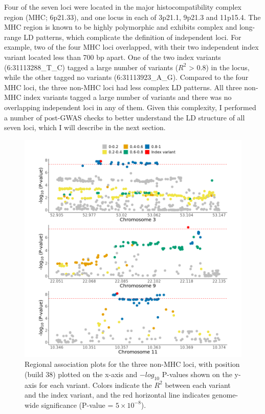     Four of the seven loci were located in the major histocompatibility complex region (MHC; 6p21.33), and one locus in each of 3p21.1, 9p21.3 and 11p15.4. The MHC region is known to be highly polymorphic and exhibits complex and long-range LD patterns, which complicate the definition of independent loci. 
    For example, two of the four MHC loci overlapped, with their two independent index variant located less than 700 bp apart. One of the two index variants (6:31113288\_T\_C) tagged a large number of variants ($R^{2}$ > 0.8) in the locus, while the other tagged no variants (6:31113923\_A\_G). Compared to the four MHC loci, the three non-MHC loci had less complex LD patterns. All three non-MHC index variants tagged a large number of variants and there was no overlapping independent loci in any of them. Given this complexity, I performed a number of post-GWAS checks to better understand the LD structure of all seven loci, which I will describe in the next section.


    \begin{figure}[H] 
      \centering    
      \includegraphics[width=1.0\textwidth]{Vector/ukbb_nonmhc_regional_assoc_plots.png}
      \caption[Figure]{Regional association plots for the three non-MHC loci, with position (build 38) plotted on the x-axis and $-log_{10}$ P-values shown on the y-axis for each variant. Colors indicate the $R^{2}$ between each variant and the index variant, and the red horizontal line indicates genome-wide significance (P-value = $5\times10^{-8}$).}
      \label{fig:ukbb_nonmhc_regional_assoc_plots}
      \end{figure}

